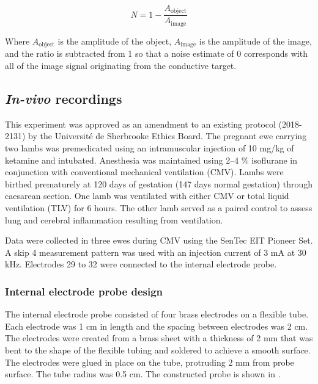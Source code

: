 \begin{equation}
	N = 1-\frac{A_{\text{object}}}{A_{\text{image}}}
\end{equation}

Where $A_{\text{object}}$ is the amplitude of the object, $A_{\text{image}}$ is the amplitude 
of the image, and the ratio is subtracted from 1 so that a noise estimate 
of 0 corresponds with 
all of the image signal originating from the conductive target.

\subsection{\emph{In-vivo} recordings}
This experiment was approved as an amendment to an existing protocol (2018-2131) 
by the Université de Sherbrooke Ethics Board. The pregnant ewe carrying two lambs was 
premedicated using an intramuscular injection of 10 mg/kg of ketamine and intubated. 
Anesthesia was maintained using 2--4 \% isoflurane in conjunction with conventional 
mechanical ventilation (CMV). Lambs were birthed prematurely at 120 days of 
gestation (147 days normal gestation) through caesarean section. 
One lamb was ventilated with either CMV or total liquid ventilation (TLV) for 6 hours. 
The other lamb served as a paired control to assess 
lung and cerebral inflammation resulting from ventilation. 

Data were collected in three ewes during CMV 
using the SenTec EIT Pioneer Set.
A skip 4 measurement pattern was used with an injection current 
of 3 mA at 30 kHz. Electrodes 29 to 32 were connected to the internal
electrode probe. 

\subsubsection{Internal electrode probe design}
The internal electrode probe consisted of four brass electrodes on a flexible tube. 
Each electrode was 1 cm in length and the spacing between electrodes was 2 cm. 
The electrodes were created from
a brass sheet with a thickness of 2 mm that was bent to the shape 
of the flexible tubing and soldered to 
achieve a smooth surface. The electrodes were glued in place 
on the tube, protruding 2 mm from probe surface.
The tube radius was 0.5 cm. The constructed probe is shown in .


